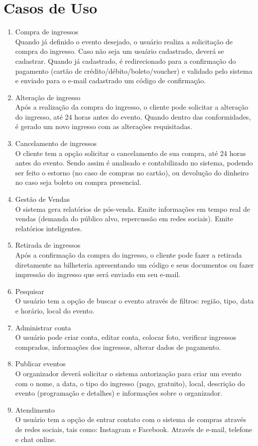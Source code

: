 \documentclass[12pt]{article}
\begin{document}
\section{Casos de Uso}
    \begin{enumerate}
        \item Compra de ingressos \\
        Quando já definido o evento desejado, o usuário realiza a solicitação de compra do ingresso. Caso não seja um usuário cadastrado, deverá se cadastrar. Quando já cadastrado, é redirecionado para a confirmação do pagamento (cartão de crédito/débito/boleto/voucher) e validado pelo sistema e enviado para o e-mail cadastrado um código de confirmação.
        \item Alteração de ingresso \\
        Após a realização da compra do ingresso, o cliente pode solicitar a alteração do ingresso, até 24 horas antes do evento. Quando dentro das conformidades, é gerado um novo ingresso com as alterações requisitadas.
        \item Cancelamento de ingressos \\
        O cliente tem a opção solicitar o cancelamento de sua compra, até 24 horas antes do evento. Sendo assim é analisado e contabilizado no sistema, podendo ser feito o estorno (no caso de compras no cartão), ou devolução do dinheiro no caso seja boleto ou compra presencial.
        \item Gestão de Vendas \\
        O sistema gera relatórios de pós-venda. Emite informações em tempo real de vendas (demanda do público alvo, repercussão em redes sociais). Emite relatórios inteligentes. 
        \item Retirada de ingressos \\
        Após a confirmação da compra do ingresso, o cliente pode fazer a retirada diretamente na bilheteria apresentando um código e seus documentos ou fazer impressão do ingresso que será enviado em seu e-mail.
        \item Pesquisar \\
        O usuário tem a opção de buscar o evento através de filtros: região, tipo, data e horário, local do evento.
        \item Administrar conta \\
        O usuário pode criar conta, editar conta, colocar foto, verificar ingressos comprados, informações dos ingressos, alterar dados de pagamento.
        \item Publicar eventos \\
        O organizador deverá solicitar o sistema autorização para criar um evento com o nome, a data, o tipo do ingresso (pago, gratuito), local, descrição do evento (programação e detalhes) e informações sobre o organizador. 
        \item Atendimento \\
        O usuário tem a opção de entrar contato com o sistema de compras através de redes sociais, tais como: Instagram e Facebook. Através de e-mail, telefone e chat online. 
    \end{enumerate}
\end{document}
